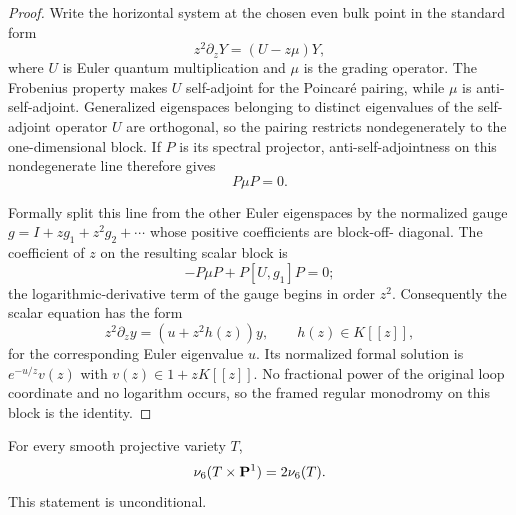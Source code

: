\begin{proof}
Write the horizontal system at the chosen even bulk point in the standard form
\[
 z^2\partial_zY=(U-z\mu)Y,
\]
where $U$ is Euler quantum multiplication and $\mu$ is the grading operator.
The Frobenius property makes $U$ self-adjoint for the Poincar\'e pairing,
while $\mu$ is anti-self-adjoint.  Generalized eigenspaces belonging to
distinct eigenvalues of the self-adjoint operator $U$ are orthogonal, so the
pairing restricts nondegenerately to the one-dimensional block.  If $P$ is
its spectral projector, anti-self-adjointness on this nondegenerate line
therefore gives
\[
 P\mu P=0.
\]

Formally split this line from the other Euler eigenspaces by the normalized
gauge $g=I+zg_1+z^2g_2+\cdots$ whose positive coefficients are block-off-
diagonal.  The coefficient of $z$ on the resulting scalar block is
\[
 -P\mu P+P[U,g_1]P=0;
\]
the logarithmic-derivative term of the gauge begins in order $z^2$.
Consequently the scalar equation has the form
\[
 z^2\partial_zy=(u+z^2h(z))y,
 \qquad h(z)\in K[[z]],
\]
for the corresponding Euler eigenvalue $u$.  Its normalized formal solution
is $e^{-u/z}v(z)$ with $v(z)\in1+zK[[z]]$.  No fractional power of the
original loop coordinate and no logarithm occurs, so the framed regular
monodromy on this block is the identity.
\end{proof}

\begin{proposition}
\label{prop:projective-product-nu}
%
%
For every smooth projective variety $T$,
\[
 \nu_6(T\times\mathbf P^1)=2\nu_6(T).
\]
This statement is unconditional.
\end{proposition}

